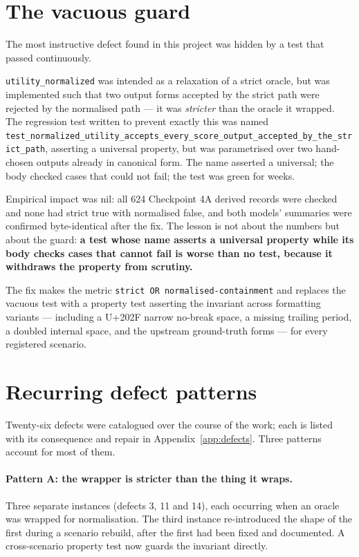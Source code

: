 \documentclass[11pt,oneside]{report}
\newcommand{\code}[1]{\texttt{\small #1}}
\begin{document}
\section{The vacuous guard}
\label{sec:defect11}

The most instructive defect found in this project was hidden by a test
that passed continuously.

\code{utility\_normalized} was intended as a relaxation of a strict
oracle, but was implemented such that two output forms accepted by the
strict path were rejected by the normalised path --- it was
\emph{stricter} than the oracle it wrapped. The regression test written
to prevent exactly this was named
\code{test\_normalized\_utility\_accepts\_every\_score\_output\_accepted\_by\_the\_strict\_path},
asserting a universal property, but was parametrised over two
hand-chosen outputs already in canonical form. The name asserted a
universal; the body checked cases that could not fail; the test was
green for weeks.

Empirical impact was nil: all 624 Checkpoint 4A derived records were
checked and none had strict true with normalised false, and both models'
summaries were confirmed byte-identical after the fix. The lesson is not
about the numbers but about the guard: \textbf{a test whose name asserts
a universal property while its body checks cases that cannot fail is
worse than no test, because it withdraws the property from scrutiny.}

The fix makes the metric \code{strict OR normalised-containment} and
replaces the vacuous test with a property test asserting the invariant
across formatting variants --- including a U+202F narrow no-break space,
a missing trailing period, a doubled internal space, and the upstream
ground-truth forms --- for every registered scenario.

\section{Recurring defect patterns}
\label{sec:patterns}

Twenty-six defects were catalogued over the course of the work; each is
listed with its consequence and repair in Appendix~\ref{app:defects}. Three
patterns account for most of them.

\paragraph{Pattern A: the wrapper is stricter than the thing it wraps.}
Three separate instances (defects 3, 11 and 14), each occurring when an oracle was wrapped for
normalisation. The third instance re-introduced the shape of the first
during a scenario rebuild, after the first had been fixed and
documented. A cross-scenario property test now guards the invariant
directly.
\end{document}
